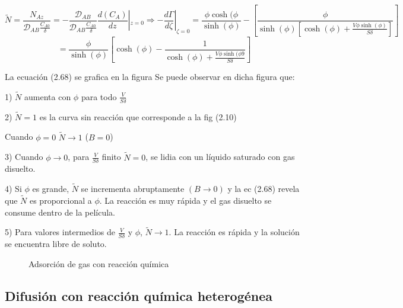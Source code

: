 \begin{equation*}
    \widetilde{N}=\frac{N_{Az}}{\mathscr{D}_{AB}\frac{C_{A0}}{\delta}}=-\frac{\mathscr{D}_{AB}}{\mathscr{D}_{AB}\frac{C_{A0}}{\delta}}\frac{d(C_A)}{dz}|_{z=0}\Rightarrow-\frac{d\Gamma}{d\zeta}|_{\zeta=0}=\frac{\phi\cosh(\phi}{\sinh(\phi)}-[\frac{\phi}{\sinh(\phi)[\cosh(\phi)+\frac{V\phi\sinh(\phi)}{S\delta}]}]
\end{equation*}
\begin{equation}
    =\frac{\phi}{\sinh(\phi)}[\cosh(\phi)-\frac{1}{\cosh(\phi)+\frac{V\phi\sinh(\phi9}{S\delta}}]
\end{equation}




La ecuación (2.68) se grafica en la figura %
Se puede observar en dicha figura que:

\vspace{1 cm}

1) $\widetilde{N}$ aumenta con $\phi$ para todo $\frac{V}{S\delta}$

2) $\widetilde{N}=1$ es la curva sin reacción que corresponde a la fig (2.10)

Cuando $\phi=0$ $\widetilde{N}\rightarrow1$ ($B=0$)


3) Cuando $\phi\rightarrow0$, para $\frac{V}{S\delta}$ finito $\widetilde{N}=0$, se lidia con un líquido saturado con gas disuelto.

4) Si $\phi$ es grande, $\widetilde{N}$ se incrementa abruptamente $(B\rightarrow 0)$ y la ec (2.68) revela que $\widetilde{N}$ es proporcional a $\phi$. La reacción es muy rápida y el gas disuelto se consume dentro de la película. 

5) Para valores intermedios de $\frac{V}{S\delta}$ y $\phi$, $\widetilde{N}\rightarrow1$. La reacción es rápida y la solución se encuentra libre de soluto. 

\begin{figure}
    \centering
    \caption{Adsorción de gas con reacción química}
\end{figure}


\subsection{Difusión con reacción química heterogénea}

